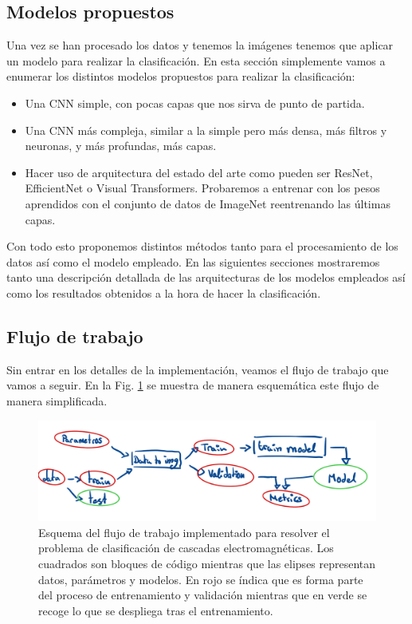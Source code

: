 \documentclass[a4paper,12pt,twoside,titlepage]{article}
\newcommand{\red}[1]{\textcolor{red}{#1}}
\begin{document}
\subsection{Modelos propuestos}

Una vez se han procesado los datos y tenemos la imágenes tenemos que aplicar un modelo para realizar la clasificación. En esta sección simplemente vamos a enumerar los distintos modelos propuestos para realizar la clasificación:

\begin{itemize}
  \item Una CNN simple, con pocas capas que nos sirva de punto de partida.
  \item Una CNN más compleja, similar a la simple pero más densa, más filtros y neuronas, y más profundas, más capas.
  \item Hacer uso de arquitectura del estado del arte como pueden ser ResNet, EfficientNet o Visual Transformers. Probaremos a entrenar con los pesos aprendidos con el conjunto de datos de ImageNet reentrenando las últimas capas.
\end{itemize}

Con todo esto proponemos distintos métodos tanto para el procesamiento de los datos así como el modelo empleado. En las siguientes secciones mostraremos tanto una descripción detallada de las arquitecturas de los modelos empleados así como los resultados obtenidos a la hora de hacer la clasificación.

\subsection{Flujo de trabajo}

Sin entrar en los detalles de la implementación, veamos el flujo de trabajo que vamos a seguir. En la Fig. \ref{fig:flujo} se muestra de manera esquemática este flujo de manera simplificada.

\begin{figure}[h!]
  \centering
  \includegraphics[scale=0.49]{flujo_tem.PNG}
  \caption{Esquema del flujo de trabajo implementado para resolver el problema de clasificación de cascadas electromagnéticas. Los cuadrados son bloques de código mientras que las elipses representan datos, parámetros y modelos. En rojo se índica que es forma parte del proceso de entrenamiento y validación mientras que en verde se recoge lo que se despliega tras el entrenamiento.}
  \label{fig:flujo}
\end{figure}
\end{document}

